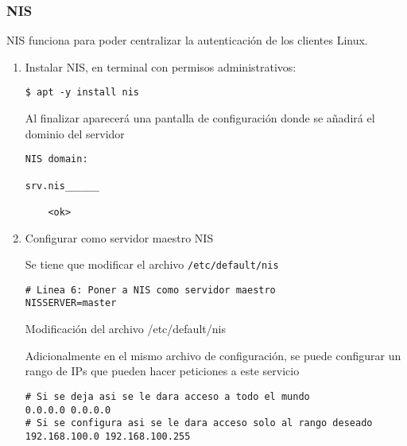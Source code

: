 \documentclass[../main.tex]{subfiles}
\begin{document}
\subsubsection{NIS}\label{sec:nis}

NIS funciona para poder centralizar la autenticación de los clientes Linux.

\begin{enumerate}
  \item Instalar NIS, en terminal con permisos administrativos:

        \begin{listing}[H]
\begin{verbatim}
$ apt -y install nis
\end{verbatim}
\end{listing}

        Al finalizar aparecerá una pantalla de configuración donde se
        añadirá el dominio del servidor

        \begin{listing}[H]
\begin{verbatim}
NIS domain:

srv.nis______

    <ok>
\end{verbatim}
\end{listing}

  \item Configurar como servidor maestro NIS

        Se tiene que modificar el archivo \texttt{/etc/default/nis}

        \begin{listing}[H]
\begin{verbatim}
# Linea 6: Poner a NIS como servidor maestro
NISSERVER=master
\end{verbatim}
    \caption{Modificación del archivo /etc/default/nis}
    \label{listing:nis}
\end{listing}

        Adicionalmente en el mismo archivo de configuración, se puede
        configurar un rango de IPs que pueden hacer peticiones
        a este servicio

        \begin{listing}[H]
\begin{verbatim}
# Si se deja asi se le dara acceso a todo el mundo
0.0.0.0 0.0.0.0
# Si se configura asi se le dara acceso solo al rango deseado
192.168.100.0 192.168.100.255
\end{verbatim}
\end{listing}


\end{enumerate}
\end{document}
